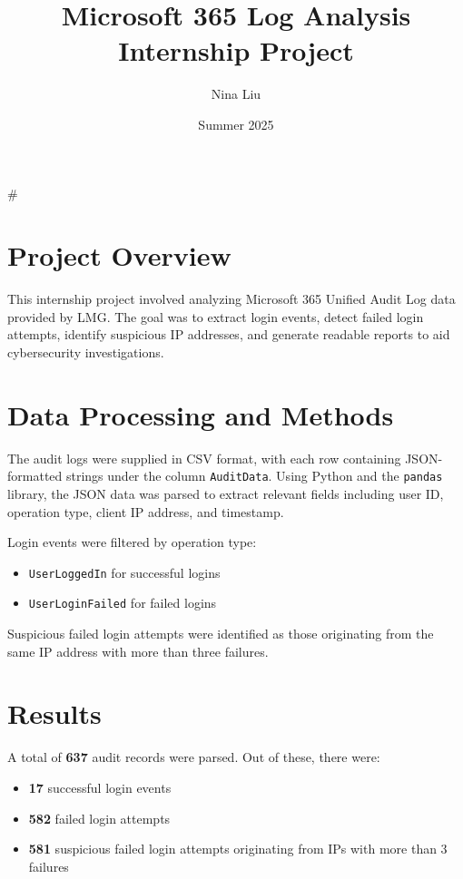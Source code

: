 #\documentclass{article}
\title{Microsoft 365 Log Analysis Internship Project}
\author{Nina Liu}
\date{Summer 2025}
\begin{document}
\maketitle

\section*{Project Overview}

This internship project involved analyzing Microsoft 365 Unified Audit Log data provided by LMG. The goal was to extract login events, detect failed login attempts, identify suspicious IP addresses, and generate readable reports to aid cybersecurity investigations.

\section*{Data Processing and Methods}

The audit logs were supplied in CSV format, with each row containing JSON-formatted strings under the column \texttt{AuditData}. Using Python and the \texttt{pandas} library, the JSON data was parsed to extract relevant fields including user ID, operation type, client IP address, and timestamp.

Login events were filtered by operation type:
\begin{itemize}
    \item \texttt{UserLoggedIn} for successful logins
    \item \texttt{UserLoginFailed} for failed logins
\end{itemize}

Suspicious failed login attempts were identified as those originating from the same IP address with more than three failures.

\section*{Results}

A total of \textbf{637} audit records were parsed. Out of these, there were:

\begin{itemize}
    \item \textbf{17} successful login events
    \item \textbf{582} failed login attempts
    \item \textbf{581} suspicious failed login attempts originating from IPs with more than 3 failures
\end{itemize}
\end{document}
